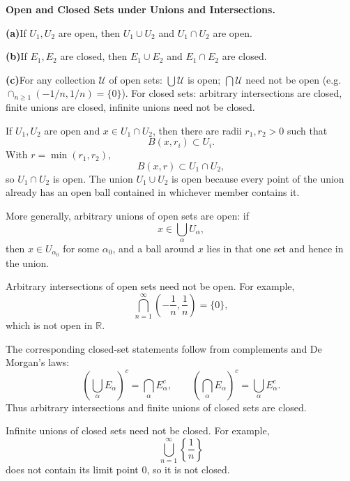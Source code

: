 \begin{problem}[CP-II-0008]
\label{prob:cp-ii-0008}
\textbf{Open and Closed Sets under Unions and Intersections.}

\renewcommand\labelenumi{(\alph{enumi})}
\par\smallskip\noindent\textbf{(a)}\quad If $U_1,U_2$ are open, then $U_1\cup U_2$ and $U_1\cap U_2$ are open.
\par\smallskip\noindent\textbf{(b)}\quad If $E_1,E_2$ are closed, then $E_1\cup E_2$ and $E_1\cap E_2$ are closed.
\par\smallskip\noindent\textbf{(c)}\quad For any collection $\mathcal U$ of open sets: $\bigcup\mathcal U$ is open; $\bigcap\mathcal U$ need not be open (e.g.\ $\cap_{n\ge1}(-1/n,1/n)=\{0\}$).
For closed sets: arbitrary intersections are closed, finite unions are closed, infinite unions need not be closed.
\end{problem}

\begin{solution}
If \(U_1,U_2\) are open and \(x\in U_1\cap U_2\), then there are radii
\(r_1,r_2>0\) such that
\[
B(x,r_i)\subset U_i.
\]
With \(r=\min(r_1,r_2)\),
\[
B(x,r)\subset U_1\cap U_2,
\]
so \(U_1\cap U_2\) is open. The union \(U_1\cup U_2\) is open because every point of the union already has an open ball contained in whichever member contains it.

More generally, arbitrary unions of open sets are open: if
\[
x\in\bigcup_{\alpha}U_\alpha,
\]
then \(x\in U_{\alpha_0}\) for some \(\alpha_0\), and a ball around \(x\) lies in that one set and hence in the union.

Arbitrary intersections of open sets need not be open. For example,
\[
\bigcap_{n=1}^{\infty}
\left(-\frac1n,\frac1n\right)
=
\{0\},
\]
which is not open in \(\mathbb R\).

The corresponding closed-set statements follow from complements and De Morgan's laws:
\[
\left(\bigcup_\alpha E_\alpha\right)^c
=
\bigcap_\alpha E_\alpha^c,
\qquad
\left(\bigcap_\alpha E_\alpha\right)^c
=
\bigcup_\alpha E_\alpha^c.
\]
Thus arbitrary intersections and finite unions of closed sets are closed.

Infinite unions of closed sets need not be closed. For example,
\[
\bigcup_{n=1}^{\infty}
\left\{\frac1n\right\}
\]
does not contain its limit point \(0\), so it is not closed.
\end{solution}


